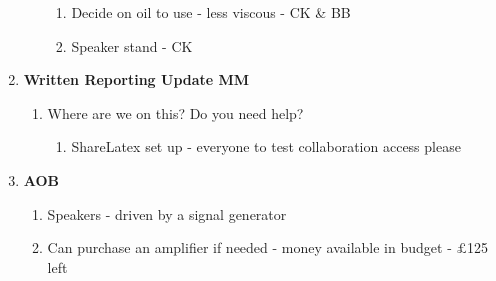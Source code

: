 \begin{enumerate}
\begin{enumerate}
\begin{enumerate}
\item  Decide on oil to use - less viscous - CK \& BB

\item  Speaker stand - CK\\
\end{enumerate}
\end{enumerate}

\item  \textbf{Written Reporting Update MM}

\begin{enumerate}
\item \textbf{ }Where are we on this? Do you need help? 

\begin{enumerate}
\item  ShareLatex set up - everyone to test collaboration access please\\
\end{enumerate}
\end{enumerate}

\item  \textbf{AOB}

\begin{enumerate}
\item \textbf{ }Speakers - driven by a signal generator

\item  Can purchase an amplifier if needed - money available in budget - $\mathsterling$125 left
\end{enumerate}
\end{enumerate}




